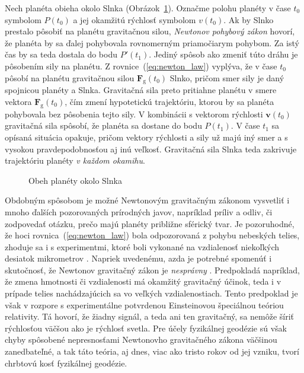 \documentclass[a4paper, 12pt]{book}
\newcommand{\gidx}{\mathrm g}
\let\vec\mathbf
\begin{document}
Nech planéta obieha okolo Slnka (Obrázok~\ref{fig:orbital_motion}).  Označme 
polohu planéty v čase $t_0$ symbolom $P(t_0)$ a jej okamžitú rýchlosť symbolom 
$v(t_0)$.  Ak by Slnko prestalo pôsobiť na planétu gravitačnou silou, 
\emph{Newtonov pohybový zákon} hovorí, že planéta by sa ďalej pohybovala 
rovnomerným priamočiarym pohybom.  Za istý čas by sa teda dostala do bodu 
$P'(t_1)$.  Jediný spôsob ako zmeniť túto dráhu je pôsobením sily na planétu.  
Z rovnice~(\ref{eq:newton_law}) vyplýva, že v čase $t_0$ pôsobí na planétu 
gravitačnou silou $\vec F_\gidx(t_0)$ Slnko, pričom smer sily je daný spojnicou 
planéty a Slnka.  Gravitačná sila preto pritiahne planétu v smere vektora $\vec 
F_\gidx(t_0)$, čím zmení hypotetickú trajektóriu, ktorou by sa planéta 
pohybovala bez pôsobenia tejto sily.  V kombinácii s vektorom rýchlosti $\vec 
v(t_0)$ gravitačná sila spôsobí, že planéta sa dostane do bodu $P(t_1)$.  
V čase $t_1$ sa opísaná situácia opakuje, pričom vektory rýchlosti a sily už 
majú iný smer a s vysokou pravdepodobnosťou aj inú veľkosť.  Gravitačná sila 
Slnka teda zakrivuje trajektóriu planéty \emph{v každom okamihu}.
%
\begin{figure}
\centering

\caption{Obeh planéty okolo Slnka}
\label{fig:orbital_motion}
\end{figure}

Obdobným spôsobom je možné Newtonovým gravitačným zákonom vysvetliť i mnoho 
ďalších pozorovaných prírodných javov, napríklad príliv a odliv, či zodpovedať 
otázku, prečo majú planéty približne sférický tvar.  Je pozoruhodné, že hoci 
rovnica~(\ref{eq:newton_law}) bola odpozorovaná z pohybu nebeských telies, 
zhoduje sa i s experimentmi, ktoré boli vykonané na vzdialenosť niekoľkých 
desiatok mikrometrov \citep{Lee2020}.  Napriek uvedenému, azda je potrebné 
spomenúť i skutočnosť, že Newtonov gravitačný zákon je \emph{nesprávny} 
\citep{Feynman}.  Predpokladá napríklad, že zmena hmotnosti či vzdialenosti má 
okamžitý gravitačný účinok, teda i v prípade telies nachádzajúcich sa vo 
veľkých vzdialenostiach.  Tento predpoklad je však v rozpore s experimentálne 
potvrdenou Einsteinovou špeciálnou teóriou relativity.  Tá hovorí, že žiadny 
signál, a teda ani ten gravitačný, sa nemôže šíriť rýchlosťou väčšou ako je 
rýchlosť svetla.  Pre účely fyzikálnej geodézie sú však chyby spôsobené 
nepresnosťami Newtonovho gravitačného zákona väčšinou zanedbateľné, a tak táto 
teória, aj dnes, viac ako tristo rokov od jej vzniku, tvorí chrbtovú kosť 
fyzikálnej geodézie.
\end{document}
